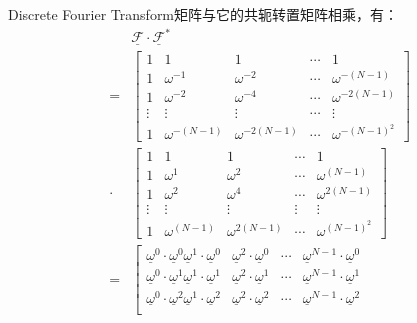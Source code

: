 Discrete Fourier Transform矩阵与它的共轭转置矩阵相乘，有：
\begin{align*}
	      & \underline{\mathcal{F}}\cdot \underline{\mathcal{F}}^{*} \\
	=     &
	\left[
		\begin{matrix}
			1      & 1               & 1                & \cdots & 1                 \\
			1      & \omega^{-1}     & \omega^{-2}      & \cdots & \omega^{-(N-1)}   \\
			1      & \omega^{-2}     & \omega^{-4}      & \cdots & \omega^{-2(N-1)}  \\
			\vdots & \vdots          & \vdots           & \cdots & \vdots            \\
			1      & \omega^{-(N-1)} & \omega^{-2(N-1)} & \cdots & \omega^{-(N-1)^2}
		\end{matrix}
		\right]                                                          \\
	\cdot &
	\left[
		\begin{matrix}
			1      & 1              & 1               & \cdots & 1                \\
			1      & \omega^{1}     & \omega^{2}      & \cdots & \omega^{(N-1)}   \\
			1      & \omega^{2}     & \omega^{4}      & \cdots & \omega^{2(N-1)}  \\
			\vdots & \vdots         & \vdots          & \vdots & \vdots           \\
			1      & \omega^{(N-1)} & \omega^{2(N-1)} & \cdots & \omega^{(N-1)^2}
		\end{matrix}
		\right]                                                          \\
	=     & \left[
		\begin{matrix}\underline{\omega}^0\cdot\underline{\omega}^0
			\underline{\omega}^1\cdot\underline{\omega}^0                                                      & \underline{\omega}^2\cdot\underline{\omega}^0     & \cdots & \underline{\omega}^{N-1}\cdot\underline{\omega}^0     \\
			\underline{\omega}^0\cdot\underline{\omega}^1\underline{\omega}^1\cdot\underline{\omega}^1         & \underline{\omega}^2\cdot\underline{\omega}^1     & \cdots & \underline{\omega}^{N-1}\cdot\underline{\omega}^1     \\
			\underline{\omega}^0\cdot\underline{\omega}^2\underline{\omega}^1\cdot\underline{\omega}^2         & \underline{\omega}^2\cdot\underline{\omega}^2     & \cdots & \underline{\omega}^{N-1}\cdot\underline{\omega}^2     \\

\end{matrix}
\end{align*}
